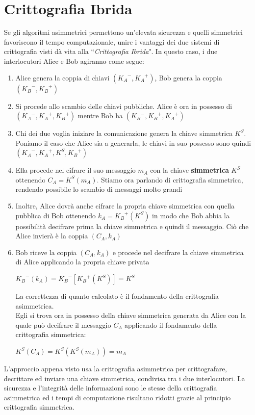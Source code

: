 \documentclass[a4paper,12pt]{tesiinfo}
\begin{document}
\section{Crittografia Ibrida}
\label{critt ibrida}
Se gli algoritmi asimmetrici permettono un'elevata sicurezza e quelli simmetrici favoriscono il tempo computazionale, unire i vantaggi dei due sistemi di crittografia visti d\`a vita alla ``\textit{Crittografia Ibrida}". In questo caso, i due interlocutori Alice e Bob agiranno come segue:
\begin{enumerate}
 \item Alice genera la coppia di chiavi $({K_A}^-, {K_A}^+)$, Bob genera la coppia $({K_B}^-, {K_B}^+)$
 \item Si procede allo scambio delle chiavi pubbliche. Alice \`e ora in possesso di $({K_A}^-, {K_A}^+, {K_B}^+)$ mentre Bob ha $({K_B}^-, {K_B}^+, {K_A}^+)$
 \item Chi dei due voglia iniziare la comunicazione genera la chiave simmetrica $K^S$. Poniamo il caso che Alice sia a generarla, le chiavi in suo possesso sono quindi $({K_A}^-, {K_A}^+, K^S, {K_B}^+)$
 \item Ella procede nel cifrare il suo messaggio $m_A$ con la chiave \textbf{simmetrica} $K^S$ ottenendo $C_A = K^S(m_A)$. Stiamo ora parlando di crittografia simmetrica, rendendo possibile lo scambio di messaggi molto grandi
 \item Inoltre, Alice dovr\`a anche cifrare la propria chiave simmetrica con quella pubblica di Bob ottenendo $k_A={K_B}^+(K^S)$ in modo che Bob abbia la possibilit\`a decifrare prima la chiave simmetrica e quindi il messaggio. Ci\`o che Alice invier\`a \`e la coppia $(C_A, k_A)$
 \item Bob riceve la coppia $(C_A, k_A)$ e procede nel decifrare la chiave simmetrica di Alice applicando la propria chiave privata 
 \begin{center}
  ${K_B}^-(k_A)={K_B}^-[{K_B}^+(K^S)]=K^S$
 \end{center}
 La correttezza di quanto calcolato \`e il fondamento della crittografia asimmetrica.\\
 Egli si trova ora in possesso della chiave simmetrica generata da Alice con la quale pu\`o decifrare il messaggio $C_A$ applicando il fondamento della crittografia simmetrica:
 \begin{center}
  ${K}^S(C_A)={K}^S({K}^S(m_A))=m_A$
 \end{center}
\end{enumerate}
L'approccio appena visto usa la crittografia asimmetrica per crittografare, decrittare ed inviare una chiave simmetrica, condivisa tra i due interlocutori. La sicurezza e l'integrit\`a delle informazioni sono le stesse della crittografia asimmetrica ed i tempi di computazione risultano ridotti grazie al principio crittografia simmetrica.
\end{document}
